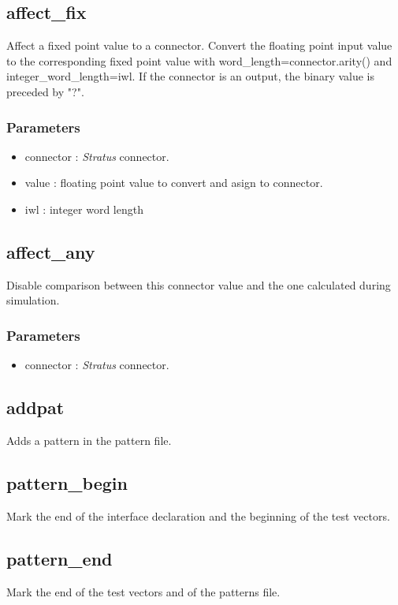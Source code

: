 \documentclass[12pt]{article}
\begin{document}
\subsection{affect\_fix}
\label{affect_fix}
Affect a fixed point value to a connector. Convert the floating point input 
value to the corresponding fixed point value with 
word\_length=connector.arity() and integer\_word\_length=iwl. If the connector 
is an output, the binary value is preceded by "?".

\subsubsection{Parameters}
\begin{itemize}
\item{connector : \emph{Stratus} connector.}
\item{value : floating point value to convert and asign to connector.}
\item{iwl : integer word length}
\end{itemize}

\subsection{affect\_any}
\label{affect_any}
Disable comparison between this connector value and the one calculated during 
simulation.

\subsubsection{Parameters}
\begin{itemize}
\item{connector : \emph{Stratus} connector.}
\end{itemize}

\subsection{addpat}
\label{addpat}
Adds a pattern in the pattern file.

\subsection{pattern\_begin}
\label{pattern_begin}
Mark the end of the interface declaration and the beginning of the test 
vectors.

\subsection{pattern\_end}
\label{pattern_end}
Mark the end of the test vectors and of the patterns file.
\end{document}
